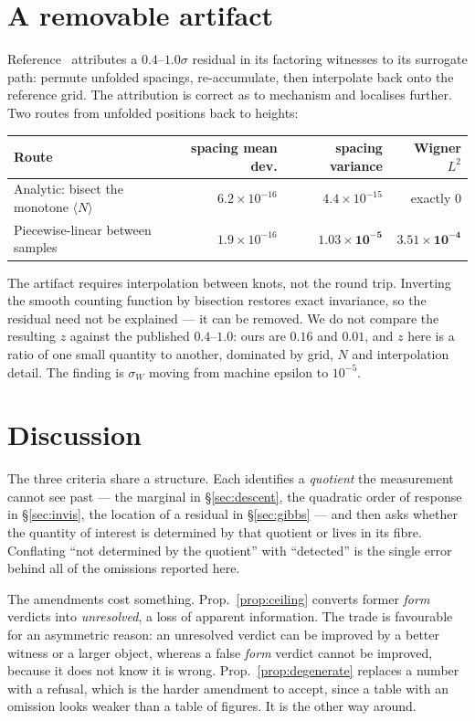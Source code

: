 \documentclass[11pt]{article}
\theoremstyle{remark}
\begin{document}
\section{A removable artifact}\label{sec:artifact}

Reference~\cite{ff06e} attributes a $0.4$--$1.0\sigma$ residual in its factoring
witnesses to its surrogate path: permute unfolded spacings, re-accumulate, then
interpolate back onto the reference grid. The attribution is correct as to mechanism and
localises further. Two routes from unfolded positions back to heights:

\begin{center}\small
\begin{tabular}{lrrr}
\toprule
Route & spacing mean dev. & spacing variance & Wigner $L^2$ \\
\midrule
Analytic: bisect the monotone $\langle N\rangle$ & $6.2\times10^{-16}$ & $4.4\times10^{-15}$ & exactly $0$ \\
Piecewise-linear between samples & $1.9\times10^{-16}$ & $\mathbf{1.03\times10^{-5}}$ & $\mathbf{3.51\times10^{-4}}$ \\
\bottomrule
\end{tabular}
\end{center}

The artifact requires interpolation between knots, not the round trip. Inverting the
smooth counting function by bisection restores exact invariance, so the residual need
not be explained --- it can be removed. We do not compare the resulting $z$ against the
published $0.4$--$1.0$: ours are $0.16$ and $0.01$, and $z$ here is a ratio of one small
quantity to another, dominated by grid, $N$ and interpolation detail. The finding is
$\sigma_W$ moving from machine epsilon to $10^{-5}$.

\section{Discussion}

The three criteria share a structure. Each identifies a \emph{quotient} the measurement
cannot see past --- the marginal in \S\ref{sec:descent}, the quadratic order of response
in \S\ref{sec:invis}, the location of a residual in \S\ref{sec:gibbs} --- and then asks
whether the quantity of interest is determined by that quotient or lives in its fibre.
Conflating ``not determined by the quotient'' with ``detected'' is the single error
behind all of the omissions reported here.

The amendments cost something. Prop.~\ref{prop:ceiling} converts former \emph{form}
verdicts into \emph{unresolved}, a loss of apparent information. The trade is favourable
for an asymmetric reason: an unresolved verdict can be improved by a better witness or a
larger object, whereas a false \emph{form} verdict cannot be improved, because it does
not know it is wrong. Prop.~\ref{prop:degenerate} replaces a number with a refusal,
which is the harder amendment to accept, since a table with an omission looks weaker
than a table of figures. It is the other way around.
\end{document}
